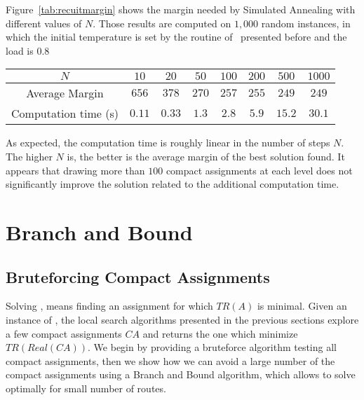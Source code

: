   
Figure~\ref{tab:recuitmargin} shows the margin needed by Simulated Annealing with different values of $N$. Those results are computed on $1,000$ random instances, in which the initial temperature is set by the routine of~\cite{osman1997meta} presented before and the load is $0.8$


\begin{center}
\begin{tabular}{ |c|c|c|c|c|c|c|c| }
\hline
    $N$ & $10$& $20$& $50$ &$100$&$200$& $500$& $1000$\\
    \hline
    Average Margin & $656$& $378$& $270$ &$257$ & $255$& $249$& $249$ \\
    \hline
    Computation time (s)& $0.11$& $0.33$& $1.3$ &$2.8$ & $5.9$& $15.2$& $30.1$\\
    \hline
 \end{tabular}
\end{center}

As expected, the computation time is roughly linear in the number of steps $N$. The higher $N$ is, the better is the average margin of the best solution found. It appears that drawing more than $100$ compact assignments at each level does not significantly improve the solution related to the additional computation time. 

 

\section{Branch and Bound}


\subsection{Bruteforcing Compact Assignments}

Solving \spall, means finding an assignment for which $TR(A)$ is minimal. 
Given an instance of \spall, the local search algorithms presented in the previous sections explore a few compact assignments $CA$ and returns the one which minimize $TR(Real(CA))$.  We begin by providing 
a bruteforce algorithm testing all compact assignments, then we show how we can avoid a large number of the compact assignments using a Branch and Bound algorithm, which allows to solve \spall optimally for small number of routes.

